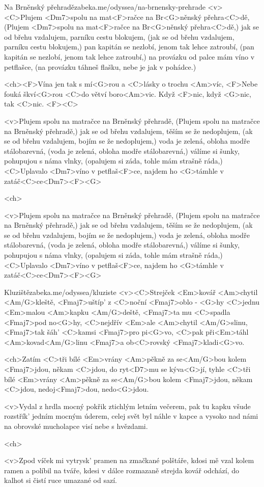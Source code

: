 \begin{song}{20}{Na Brněnský přehradě}{zabeka.me/odyssea/na-brnensky-prehrade}
	<v><C>Plujem <Dm7>spolu na mat<F>račce na Br<G>něnský přehra<C>dě,
	(Plujem <Dm7>spolu na mat<F>račce na Br<G>něnský přehra<C>dě,)
	jak se od břehu vzdalujem, parníku cestu blokujem,
	(jak se od břehu vzdalujem, parníku cestu blokujem,)
	pan kapitán se nezlobí, jenom tak lehce zatroubí,
	(pan kapitán se nezlobí, jenom tak lehce zatroubí,)
	na provázku od palce mám víno v petflašce,
	(na provázku táhneš flašku, nebe je jak v pohádce.)

	<ch><F>Vína jen tak s mí<G>rou a <C>lásky o trochu <Am>víc,
	<F>Nebe fouká škví<G>rou <C>do větví boro<Am>vic.
	Když <F>nic, když <G>nic, tak <C>nic. <F><C>

	<v>Plujem spolu na matračce na Brněnský přehradě,
	(Plujem spolu na matračce na Brněnský přehradě,)
	jak se od břehu vzdalujem, těším se že nedoplujem,
	(ak se od břehu vzdalujem, bojím se že nedoplujem,)
	voda je zelená, obloha modře stálobarevná,
	(voda je zelená, obloha modře stálobarevná,)
	válíme si šunky, pohupujou s náma vlnky,
	(opalujem si záda, tohle mám strašně ráda,)
	<C>Uplavalo <Dm7>víno v petflaš<F>ce, najdem ho <G>támhle v zatáč<C>ce<Dm7><F><G>

	<ch>

	<v>Plujem spolu na matračce na Brněnský přehradě,
	(Plujem spolu na matračce na Brněnský přehradě,)
	jak se od břehu vzdalujem, těším se že nedoplujem,
	(ak se od břehu vzdalujem, bojím se že nedoplujem,)
	voda je zelená, obloha modře stálobarevná,
	(voda je zelená, obloha modře stálobarevná,)
	válíme si šunky, pohupujou s náma vlnky,
	(opalujem si záda, tohle mám strašně ráda,)
	<C>Uplavalo <Dm7>víno v petflaš<F>ce, najdem ho <G>támhle v zatáč<C>ce<Dm7><F><G>
\end{song}
\begin{song}{21}{Kluziště}{zabeka.me/odyssea/kluziste}
	<v><C>Strejček <Em>kovář <Am>chytil <Am/G>kleště,
	<Fmaj7>uštíp' z <C>noční <Fmaj7>oblo - <G>hy
	<C>jednu <Em>malou <Am>kapku <Am/G>deště, <Fmaj7>ta mu <C>spadla <Fmaj7>pod no<G>hy,
	<C>nejdřív <Em>ale <Am>chytil <Am/G>slinu, <Fmaj7>tak šáh' <C>kamsi <Fmaj7>pro pi<G>vo,
	<C>pak při<Em>táhl <Am>kovad<Am/G>linu <Fmaj7>a ob<C>rovský <Fmaj7>kladi<G>vo.

	<ch>Zatím <C>tři bílé <Em>vrány <Am>pěkně za se<Am/G>bou
	kolem <Fmaj7>jdou, někam <C>jdou, do ryt<D7>mu se kýva<G>jí,
	tyhle <C>tři bílé <Em>vrány <Am>pěkně za se<Am/G>bou
	kolem <Fmaj7>jdou, někam <C>jdou, nedoj<Fmaj7>dou, nedo<G>jdou.

	<v>Vydal z hrdla mocný pokřik ztichlým letním večerem,
	pak tu kapku všude rozstřík' jedním mocným úderem,
	celej svět byl náhle v kapce a vysoko nad námi
	na obrovské mucholapce visí nebe s hvězdami.

	<ch>

	<v>Zpod víček mi vytrysk' pramen na zmačkané polštáře,
	kdosi mě vzal kolem ramen a políbil na tváře,
	kdesi v dálce rozmazaně strejda kovář odchází,
	do kalhot si čistí ruce umazané od sazí.
\end{song}
